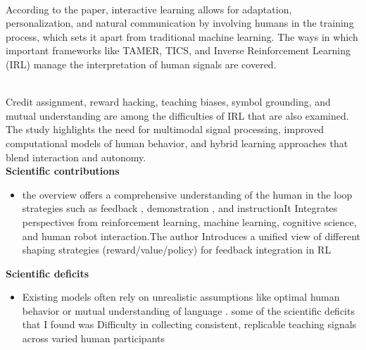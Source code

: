 \documentclass[report.tex]{subfiles}
\begin{document}
\noindent\textbf{}\\According to the paper, interactive learning allows for adaptation, personalization, and natural communication by involving humans in the training process, which sets it apart from traditional machine learning. The ways in which important frameworks like TAMER, TICS, and Inverse Reinforcement Learning (IRL) manage the interpretation of human signals are covered.

\noindent\textbf{}\\Credit assignment, reward hacking, teaching biases, symbol grounding, and mutual understanding are among the difficulties of IRL that are also examined. The study highlights the need for multimodal signal processing, improved computational models of human behavior, and hybrid learning approaches that blend interaction and autonomy.\\


\noindent\textbf{Scientific contributions} 
\begin{itemize}
        \item the overview offers a comprehensive understanding of the human in the loop strategies such as feedback , demonstration , and instructionIt Integrates perspectives from reinforcement learning, machine learning, cognitive science, and human robot interaction.The author Introduces a unified view of different shaping strategies (reward/value/policy) for feedback integration in RL
        
\end{itemize}

\noindent\textbf{Scientific deficits} 
\begin{itemize}
        \item Existing models often rely on unrealistic assumptions like optimal human behavior or mutual understanding of language . some of the scientific deficits that I found was Difficulty in collecting consistent, replicable teaching signals across varied human participants
        
\end{itemize}
\end{document}
